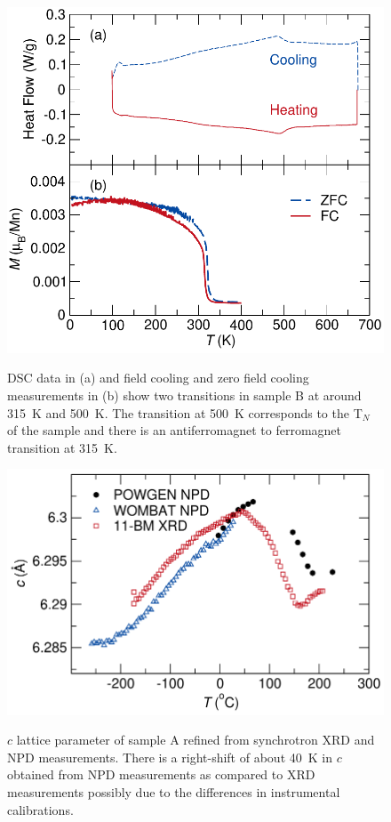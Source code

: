 \documentclass[10pt,doublespacing,edeposit]{uiucthesis2020}
\begin{document}
\begin{mainmatter}
\begin{figure}[h]
\centering\includegraphics[width=0.7\columnwidth]{figures/ch7/suppl_sampleC_DSC_SQUID_cropped.pdf} \\
\caption{\label{fig:DSC_SQUID_B}
DSC data in (a) and field cooling and zero field cooling measurements in (b) show two transitions in sample B at around 315~K and 500~K. The transition at 500~K corresponds to the T$_N$ of the sample and there is an antiferromagnet to ferromagnet transition at 315~K.
} 
\end{figure}

\begin{figure}[h]
\centering\includegraphics[width=0.7\columnwidth]{figures/ch7/supplementary_lattice_parameter_cropped.pdf} \\
\caption{\label{fig:lattice_param}
$c$ lattice parameter of sample A refined from synchrotron XRD and NPD measurements. There is a right-shift of about 40~K in $c$ obtained from NPD measurements as compared to XRD measurements possibly due to the differences in instrumental calibrations.
} 
\end{figure}




\end{mainmatter}
\end{document}
